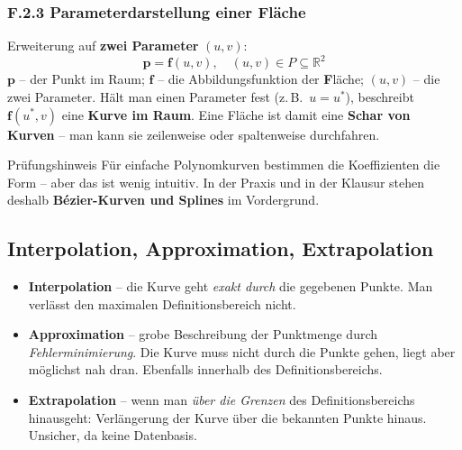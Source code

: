 \documentclass[12pt, a4paper]{article}
\begin{document}
\subsubsection*{F.2.3 Parameterdarstellung einer Fläche}

Erweiterung auf \textbf{zwei Parameter} $(u, v)$:
\[
  \mathbf{p} = \mathbf{f}(u, v), \quad (u,v) \in P \subseteq \mathbb{R}^2
\]
$\mathbf{p}$ -- der Punkt im Raum; $\mathbf{f}$ -- die Abbildungsfunktion der \textbf{F}läche; $(u,v)$ -- die zwei Parameter. Hält man einen Parameter fest (z.\,B.\ $u = u^*$), beschreibt $\mathbf{f}(u^*, v)$ eine \textbf{Kurve im Raum}. Eine Fläche ist damit eine \textbf{Schar von Kurven} -- man kann sie zeilenweise oder spaltenweise durchfahren.

\begin{notebox}{Prüfungshinweis}
Für einfache Polynomkurven bestimmen die Koeffizienten die Form -- aber das ist wenig intuitiv. In der Praxis und in der Klausur stehen deshalb \textbf{Bézier-Kurven und Splines} im Vordergrund.
\end{notebox}

\subsection{Interpolation, Approximation, Extrapolation}

\begin{itemize}
  \item \textbf{Interpolation} -- die Kurve geht \textit{exakt durch} die gegebenen Punkte. Man verlässt den maximalen Definitionsbereich nicht.
  \item \textbf{Approximation} -- grobe Beschreibung der Punktmenge durch \textit{Fehlerminimierung}. Die Kurve muss nicht durch die Punkte gehen, liegt aber möglichst nah dran. Ebenfalls innerhalb des Definitionsbereichs.
  \item \textbf{Extrapolation} -- wenn man \textit{über die Grenzen} des Definitionsbereichs hinausgeht: Verlängerung der Kurve über die bekannten Punkte hinaus. Unsicher, da keine Datenbasis.
\end{itemize}
\end{document}
